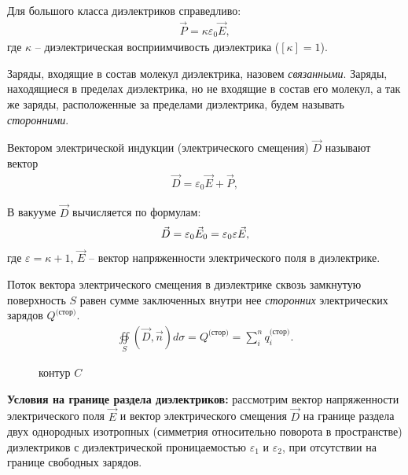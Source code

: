 \documentclass[__main__.tex]{subfiles}
\begin{document}
Для большого класса диэлектриков справедливо:
\begin{gather}
	\vec{P} = \kappa\varepsilon_0\vec{E},
\end{gather}
где $\kappa$ -- диэлектрическая восприимчивость диэлектрика ($[\kappa]=1$).

Заряды, входящие в состав молекул диэлектрика, назовем \emph{связанными}. Заряды, находящиеся в пределах диэлектрика, но не входящие в состав его молекул, а так же заряды, расположенные за пределами диэлектрика, будем называть \emph{сторонними}.

\begin{definition}
	Вектором электрической индукции (электрического смещения) $\vec{D}$ называют вектор
	\begin{gather}
		\vec{D} = \varepsilon_0\vec{E}+\vec{P},
	\end{gather}
\end{definition}

В вакууме $\vec{D}$ вычисляется по формулам:
\begin{gather}
	\vec{D} = \varepsilon_0\vec{E}_0 = \varepsilon_0\varepsilon\vec{E},\llabel{eq:deq}
\end{gather}
где $\varepsilon=\kappa+1$, $\vec{E}$ -- вектор напряженности электрического поля в диэлектрике.

\begin{theorem}
	Поток вектора электрического смещения в диэлектрике сквозь замкнутую поверхность $S$ равен сумме заключенных внутри нее \emph{сторонних} электрических зарядов $Q^{\text{(стор)}}$.
	\begin{gather}
		\oiint\limits_{S}(\vec{D},\vec{n})d\sigma = Q^{\text{(стор)}} = \sum_{i}^{n}q_i^{\text{(стор)}}.
	\end{gather}
\end{theorem}

\begin{wrapfigure}{r}{.3\linewidth}
	\centering
	\def\svgwidth{1\linewidth}
	
	\caption{контур $C$}
\end{wrapfigure}

\textbf{Условия на границе раздела диэлектриков:} рассмотрим вектор напряженности электрического поля $\vec{E}$ и вектор электрического смещения $\vec{D}$ на границе раздела двух однородных изотропных (симметрия относительно поворота в пространстве) диэлектриков с диэлектрической проницаемостью $\varepsilon_1$ и $\varepsilon_2$, при отсутствии на границе свободных зарядов.
\end{document}
